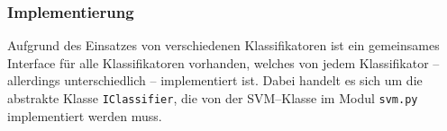 \subsubsection{Implementierung}\label{sec:svm_implementation}
Aufgrund des Einsatzes von verschiedenen Klassifikatoren ist ein gemeinsames Interface für alle Klassifikatoren vorhanden, welches von jedem Klassifikator -- allerdings unterschiedlich -- implementiert ist. 
Dabei handelt es sich um die abstrakte Klasse \texttt{IClassifier}, die von der \ac{SVM}--Klasse im Modul \texttt{svm.py}  implementiert werden muss.

	



	





